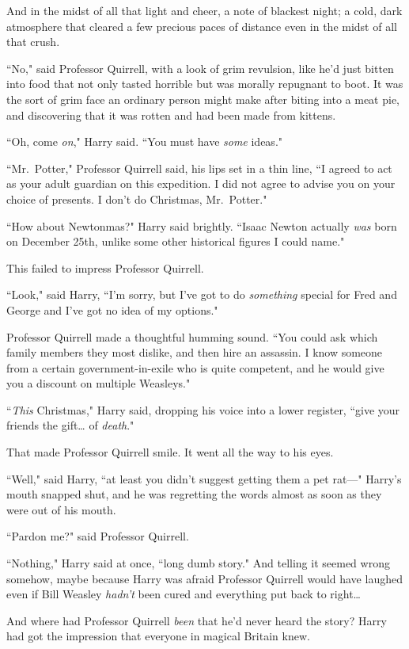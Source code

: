 And in the midst of all that light and cheer, a note of blackest night; a cold, dark atmosphere that cleared a few precious paces of distance even in the midst of all that crush.

``No," said Professor Quirrell, with a look of grim revulsion, like he'd just bitten into food that not only tasted horrible but was morally repugnant to boot. It was the sort of grim face an ordinary person might make after biting into a meat pie, and discovering that it was rotten and had been made from kittens.

``Oh, come \emph{on}," Harry said. ``You must have \emph{some} ideas."

``Mr.~Potter," Professor Quirrell said, his lips set in a thin line, ``I agreed to act as your adult guardian on this expedition. I did not agree to advise you on your choice of presents. I don't do Christmas, Mr.~Potter."

``How about Newtonmas?" Harry said brightly. ``Isaac Newton actually \emph{was} born on December 25th, unlike some other historical figures I could name."

This failed to impress Professor Quirrell.

``Look," said Harry, ``I'm sorry, but I've got to do \emph{something} special for Fred and George and I've got no idea of my options."

Professor Quirrell made a thoughtful humming sound. ``You could ask which family members they most dislike, and then hire an assassin. I know someone from a certain government-in-exile who is quite competent, and he would give you a discount on multiple Weasleys."

``\emph{This} Christmas," Harry said, dropping his voice into a lower register, ``give your friends the gift{\ldots} of \emph{death}."

That made Professor Quirrell smile. It went all the way to his eyes.

``Well," said Harry, ``at least you didn't suggest getting them a pet rat---" Harry's mouth snapped shut, and he was regretting the words almost as soon as they were out of his mouth.

``Pardon me?" said Professor Quirrell.

``Nothing," Harry said at once, ``long dumb story." And telling it seemed wrong somehow, maybe because Harry was afraid Professor Quirrell would have laughed even if Bill Weasley \emph{hadn't} been cured and everything put back to right{\ldots}

And where had Professor Quirrell \emph{been} that he'd never heard the story? Harry had got the impression that everyone in magical Britain knew.


